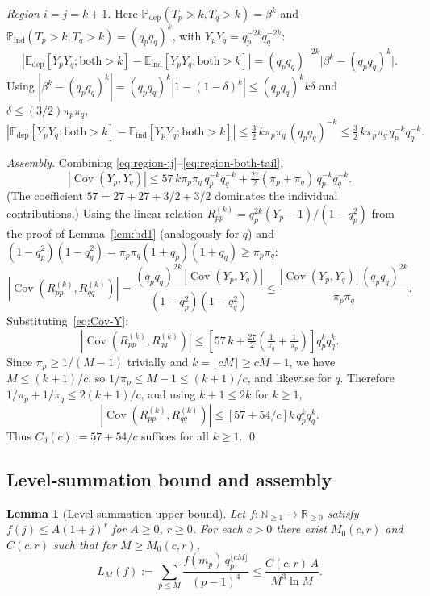 \documentclass[11pt]{article}
\newtheorem{lemma}[theorem]{Lemma}
\theoremstyle{remark}
\newcommand{\PP}{\mathbb{P}}
\newcommand{\EE}{\mathbb{E}}
\DeclareMathOperator{\Cov}{Cov}
\begin{document}
\textit{Region $i = j = k+1$.} Here $\PP_{\mathrm{dep}}(T_p > k, T_q > k) = \beta^k$ and $\PP_{\mathrm{ind}}(T_p > k, T_q > k) = (q_p q_q)^k$, with $Y_p Y_q = q_p^{-2k} q_q^{-2k}$:
\[
|\EE_{\mathrm{dep}}[Y_p Y_q; \text{both} > k] - \EE_{\mathrm{ind}}[Y_p Y_q; \text{both} > k]| = (q_p q_q)^{-2k}\bigl|\beta^k - (q_p q_q)^k\bigr|.
\]
Using $|\beta^k - (q_p q_q)^k| = (q_p q_q)^k |1 - (1-\delta)^k| \leq (q_p q_q)^k k \delta$ and $\delta \leq (3/2)\pi_p \pi_q$,
\begin{equation}\label{eq:region-both-tail}
|\EE_{\mathrm{dep}}[Y_p Y_q; \text{both} > k] - \EE_{\mathrm{ind}}[Y_p Y_q; \text{both} > k]| \leq \tfrac{3}{2}\, k \pi_p \pi_q\, (q_p q_q)^{-k} \leq \tfrac{3}{2}\, k \pi_p \pi_q\, q_p^{-k} q_q^{-k}.
\end{equation}

\textit{Assembly.} Combining \eqref{eq:region-ij}--\eqref{eq:region-both-tail},
\begin{equation}\label{eq:Cov-Y}
|\Cov(Y_p, Y_q)| \leq 57\, k \pi_p \pi_q\, q_p^{-k} q_q^{-k} + \tfrac{27}{2}(\pi_p + \pi_q)\, q_p^{-k} q_q^{-k}.
\end{equation}
(The coefficient $57 = 27 + 27 + 3/2 + 3/2$ dominates the individual contributions.) Using the linear relation $R_{pp}^{(k)} = q_p^{2k}(Y_p - 1)/(1 - q_p^2)$ from the proof of Lemma~\ref{lem:bd1} (analogously for $q$) and $(1 - q_p^2)(1 - q_q^2) = \pi_p \pi_q (1 + q_p)(1 + q_q) \geq \pi_p \pi_q$:
\[
|\Cov(R_{pp}^{(k)}, R_{qq}^{(k)})| = \frac{(q_p q_q)^{2k}\, |\Cov(Y_p, Y_q)|}{(1 - q_p^2)(1 - q_q^2)} \leq \frac{|\Cov(Y_p, Y_q)|\, (q_p q_q)^{2k}}{\pi_p \pi_q}.
\]
Substituting~\eqref{eq:Cov-Y}:
\[
|\Cov(R_{pp}^{(k)}, R_{qq}^{(k)})| \leq \left[57\, k + \tfrac{27}{2}\!\left(\tfrac{1}{\pi_q} + \tfrac{1}{\pi_p}\right)\right] q_p^k q_q^k.
\]
Since $\pi_p \geq 1/(M-1)$ trivially and $k = \lfloor cM \rfloor \geq cM - 1$, we have $M \leq (k+1)/c$, so $1/\pi_p \leq M - 1 \leq (k+1)/c$, and likewise for $q$. Therefore $1/\pi_p + 1/\pi_q \leq 2(k+1)/c$, and using $k+1 \leq 2k$ for $k \geq 1$,
\[
|\Cov(R_{pp}^{(k)}, R_{qq}^{(k)})| \leq \left[57 + 54/c\right] k\, q_p^k q_q^k.
\]
Thus $C_0(c) := 57 + 54/c$ suffices for all $k \geq 1$. \qed

\subsection{Level-summation bound and assembly}

\begin{lemma}[Level-summation upper bound]\label{lem:levelsum}
Let $f \colon \mathbb{N}_{\geq 1} \to \mathbb{R}_{\geq 0}$ satisfy $f(j) \leq A(1 + j)^r$ for $A \geq 0$, $r \geq 0$. For each $c > 0$ there exist $M_0(c, r)$ and $C(c, r)$ such that for $M \geq M_0(c, r)$,
\begin{equation}\label{eq:Lfbd}
L_M(f) := \sum_{p \leq M} \frac{f(m_p)\, q_p^{\lfloor cM \rfloor}}{(p-1)^4} \leq \frac{C(c, r)\, A}{M^3 \ln M}.
\end{equation}
\end{lemma}
\end{document}
